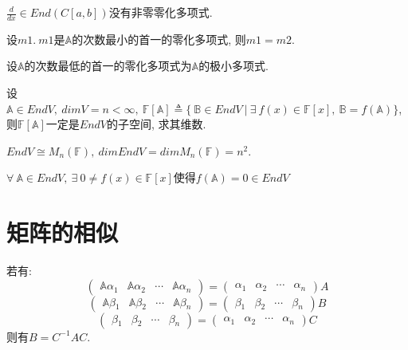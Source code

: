 \begin{example}
    $\frac{d}{dx}\in End(C[a,b])$没有非零零化多项式.
\end{example}

\begin{lemma}[极小多项式的唯一性]
    设$m1. \ m1$是$\mathbb{A}$的次数最小的首一的零化多项式, 则$m1=m2$.
\end{lemma}

\begin{definition}[极小多项式]
    设$\mathbb{A}$的次数最低的首一的零化多项式为$\mathbb{A}$的极小多项式.
\end{definition}

\begin{example}
    设$\mathbb{A}\in EndV, \ dimV=n<\infty, \ \mathbb{F}[\mathbb{A}]\triangleq \{\ \mathbb{B}\in EndV\ |\ \exists \ f(x)\in \mathbb{F}[x], \ \mathbb{B}=f(\mathbb{A})\}$, 则$\mathbb{F}[\mathbb{A}]$一定是$EndV$的子空间, 求其维数.
\end{example}

\begin{theorem}
    $EndV\cong M_n(\mathbb{F}), \ dimEndV=dimM_n(\mathbb{F})=n^2$.
\end{theorem}

\begin{inference}
    $\forall \ \mathbb{A}\in EndV, \ \exists \ 0\ne f(x)\in\mathbb{F}[x]$使得$f(\mathbb{A})=0\in EndV$
\end{inference}

\section{ 矩阵的相似 }

\begin{lemma}
    若有:
    \[\begin{pmatrix}
        \mathbb{A}\alpha{_1} & \mathbb{A}\alpha{_2} & \cdots & \mathbb{A}\alpha{_n}
    \end{pmatrix}=\begin{pmatrix}
        \alpha{_1} & \alpha{_2} & \cdots & \alpha{_n}
    \end{pmatrix}A\]
    \[\begin{pmatrix}
        \mathbb{A}\beta{_1} & \mathbb{A}\beta{_2} & \cdots & \mathbb{A}\beta{_n}
    \end{pmatrix}=\begin{pmatrix}
        \beta{_1} & \beta{_2} & \cdots & \beta{_n}
    \end{pmatrix}B\]
    \[\begin{pmatrix}
        \beta{_1} & \beta{_2} & \cdots & \beta{_n}
    \end{pmatrix}=\begin{pmatrix}
        \alpha{_1} & \alpha{_2} & \cdots & \alpha{_n}
    \end{pmatrix}C\]
    则有$B=C^{-1}AC$.
\end{lemma}

